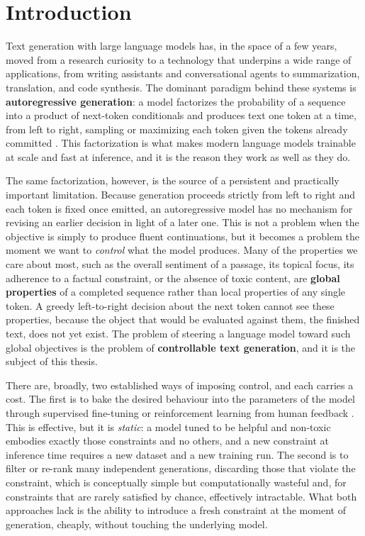 \chapter{Introduction}
\label{ch:introduction}

Text generation with large language models has, in the space of a few years, moved from a research curiosity to a technology that underpins a wide range of applications, from writing assistants and conversational agents to summarization, translation, and code synthesis. The dominant paradigm behind these systems is \textbf{autoregressive generation}: a model factorizes the probability of a sequence into a product of next-token conditionals and produces text one token at a time, from left to right, sampling or maximizing each token given the tokens already committed \citep{radford2019language, brown2020language}. This factorization is what makes modern language models trainable at scale and fast at inference, and it is the reason they work as well as they do.

The same factorization, however, is the source of a persistent and practically important limitation. Because generation proceeds strictly from left to right and each token is fixed once emitted, an autoregressive model has no mechanism for revising an earlier decision in light of a later one. This is not a problem when the objective is simply to produce fluent continuations, but it becomes a problem the moment we want to \emph{control} what the model produces. Many of the properties we care about most, such as the overall sentiment of a passage, its topical focus, its adherence to a factual constraint, or the absence of toxic content, are \textbf{global properties} of a completed sequence rather than local properties of any single token. A greedy left-to-right decision about the next token cannot see these properties, because the object that would be evaluated against them, the finished text, does not yet exist. The problem of steering a language model toward such global objectives is the problem of \textbf{controllable text generation}, and it is the subject of this thesis.

There are, broadly, two established ways of imposing control, and each carries a cost. The first is to bake the desired behaviour into the parameters of the model through supervised fine-tuning or reinforcement learning from human feedback \citep{ouyang2022training}. This is effective, but it is \emph{static}: a model tuned to be helpful and non-toxic embodies exactly those constraints and no others, and a new constraint at inference time requires a new dataset and a new training run. The second is to filter or re-rank many independent generations, discarding those that violate the constraint, which is conceptually simple but computationally wasteful and, for constraints that are rarely satisfied by chance, effectively intractable. What both approaches lack is the ability to introduce a fresh constraint at the moment of generation, cheaply, without touching the underlying model.


